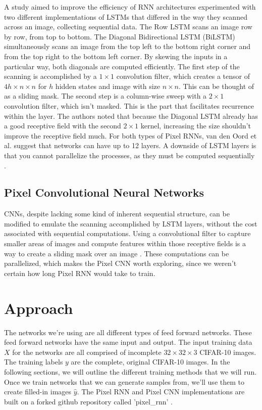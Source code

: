 \documentclass[10pt,twocolumn,letterpaper]{article}
\begin{document}
A study aimed to improve the efficiency of RNN architectures experimented with two different implementations of LSTMs that differed in the way they scanned across an image, collecting sequential data. The Row LSTM scans an image row by row, from top to bottom. The Diagonal Bidirectional LSTM (BiLSTM) simultaneously scans an image from the top left to the bottom right corner and from the top right to the bottom left corner. By skewing the inputs in a particular way, both diagonals are computed efficiently. The first step of the scanning is accomplished by a $1 \times 1$ convolution filter, which creates a tensor of $4h \times n \times n$ for $h$ hidden states and image with size $n \times n$. This can be thought of as a sliding mask. The second step is a column-wise sweep with a $2  \times  1$ convolution filter, which isn't masked. This is the part that facilitates recurrence within the layer. The authors noted that because the Diagonal LSTM already has a good receptive field with the second $2  \times  1$ kernel, increasing the size shouldn't improve the receptive field much. For both types of Pixel RNNs, van den Oord et al. suggest that networks can have up to 12 layers. A downside of LSTM layers is that you cannot parallelize the processes, as they must be computed sequentially \cite{pixelRNN}. \\

\subsection{Pixel Convolutional Neural Networks}
CNNs, despite lacking some kind of inherent sequential structure, can be modified to emulate the scanning accomplished by LSTM layers, without the cost associated with sequential computations. Using a convolutional filter to capture smaller areas of images and compute features within those receptive fields is a way to create a sliding mask over an image \cite{pixelRNN}. These computations can be parallelized, which makes the Pixel CNN worth exploring, since we weren't certain how long Pixel RNN would take to train. \\

\section{Approach}
The networks we're using are all different types of feed forward networks. These feed forward networks have the same input and output. The input training data $X$ for the networks are all comprised of incomplete $32 \times 32 \times 3$ CIFAR-10 images. The training labels $y$ are the complete, original CIFAR-10 images. In the following sections, we will outline the different training methods that we will run. Once we train networks that we can generate samples from, we'll use them to create filled-in images $\hat{y}$. The Pixel RNN and Pixel CNN implementations are built on a forked github repository called 'pixel\_rnn' \cite{igul_github}. \\
\end{document}

